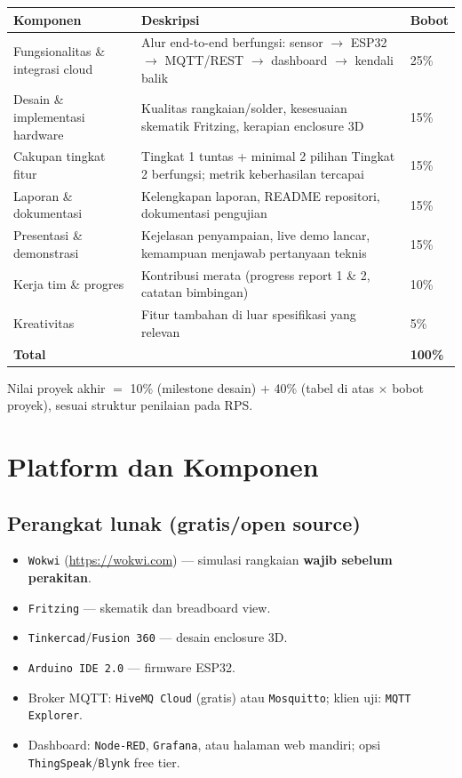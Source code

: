 \documentclass[11pt,a4paper]{article}
\begin{document}
\begin{center}
\begin{tabular}{>{\raggedright\arraybackslash}p{4.6cm}>{\raggedright\arraybackslash}p{7.9cm}p{1.8cm}}
\toprule
\textbf{Komponen} & \textbf{Deskripsi} & \textbf{Bobot} \\
\midrule
Fungsionalitas \& integrasi cloud & Alur end-to-end berfungsi: sensor
  $\rightarrow$ ESP32 $\rightarrow$ MQTT/REST $\rightarrow$ dashboard
  $\rightarrow$ kendali balik & 25\% \\
Desain \& implementasi hardware & Kualitas rangkaian/solder, kesesuaian
  skematik Fritzing, kerapian enclosure 3D & 15\% \\
Cakupan tingkat fitur & Tingkat 1 tuntas + minimal 2 pilihan Tingkat 2
  berfungsi; metrik keberhasilan tercapai & 15\% \\
Laporan \& dokumentasi & Kelengkapan laporan, README repositori, dokumentasi
  pengujian & 15\% \\
Presentasi \& demonstrasi & Kejelasan penyampaian, live demo lancar, kemampuan
  menjawab pertanyaan teknis & 15\% \\
Kerja tim \& progres & Kontribusi merata (progress report 1 \& 2, catatan
  bimbingan) & 10\% \\
Kreativitas & Fitur tambahan di luar spesifikasi yang relevan & 5\% \\
\midrule
\textbf{Total} & & \textbf{100\%} \\
\bottomrule
\end{tabular}
\end{center}

Nilai proyek akhir $=$ 10\% (milestone desain) $+$ 40\% (tabel di atas
$\times$ bobot proyek), sesuai struktur penilaian pada RPS.

\section{Platform dan Komponen}

\subsection*{Perangkat lunak (gratis/open source)}

\begin{itemize}
  \item \texttt{Wokwi} (\url{https://wokwi.com}) --- simulasi rangkaian
        \textbf{wajib sebelum perakitan}.
  \item \texttt{Fritzing} --- skematik dan breadboard view.
  \item \texttt{Tinkercad}/\texttt{Fusion 360} --- desain enclosure 3D.
  \item \texttt{Arduino IDE 2.0} --- firmware ESP32.
  \item Broker MQTT: \texttt{HiveMQ Cloud} (gratis) atau \texttt{Mosquitto};
        klien uji: \texttt{MQTT Explorer}.
  \item Dashboard: \texttt{Node-RED}, \texttt{Grafana}, atau halaman web
        mandiri; opsi \texttt{ThingSpeak}/\texttt{Blynk} free tier.
\end{itemize}
\end{document}
